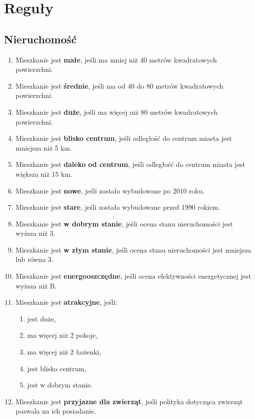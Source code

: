 \section{Reguły}

\subsection{Nieruchomość}
\begin{enumerate}[label=N\arabic*.]
    \item Mieszkanie jest \textbf{małe}, jeśli ma mniej niż 40 metrów kwadratowych powierzchni.
    \item Mieszkanie jest \textbf{średnie}, jeśli ma od 40 do 80 metrów kwadratowych powierzchni.
    \item Mieszkanie jest \textbf{duże}, jeśli ma więcej niż 80 metrów kwadratowych powierzchni.
    \item Mieszkanie jest \textbf{blisko centrum}, jeśli odległość do centrum miasta jest mniejsza niż 5 km.
    \item Mieszkanie jest \textbf{daleko od centrum}, jeśli odległość do centrum miasta jest większa niż 15 km.
    \item Mieszkanie jest \textbf{nowe}, jeśli zostało wybudowane po 2010 roku.
    \item Mieszkanie jest \textbf{stare}, jeśli zostało wybudowane przed 1990 rokiem.
    \item Mieszkanie jest \textbf{w dobrym stanie}, jeśli ocena stanu nieruchomości jest wyższa niż 3.
    \item Mieszkanie jest \textbf{w złym stanie}, jeśli ocena stanu nieruchomości jest mniejsza lub równa 3.
    \item Mieszkanie jest \textbf{energooszczędne}, jeśli ocena efektywności energetycznej jest wyższa niż B.
    \item Mieszkanie jest \textbf{atrakcyjne}, jeśli:
    \begin{enumerate}[label=\arabic*.]
        \item jest duże,
        \item ma więcej niż 2 pokoje,
        \item ma więcej niż 2 łazienki,
        \item jest blisko centrum,
        \item jest w dobrym stanie.
    \end{enumerate}
    \item Mieszkanie jest \textbf{przyjazne dla zwierząt}, jeśli polityka dotycząca zwierząt pozwala na ich posiadanie.

\end{enumerate}

